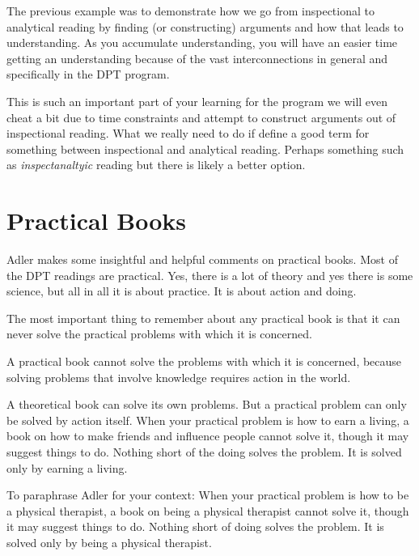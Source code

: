 The previous example was to demonstrate how we go from inspectional to analytical reading by finding (or constructing) arguments and how that leads to understanding. As you accumulate understanding, you will have an easier time getting an understanding because of the vast interconnections in general and specifically in the DPT program. 

This is such an important part of your learning for the program we will even cheat a bit due to time constraints and attempt to construct arguments out of inspectional reading. What we really need to do if define a good term for something between inspectional and analytical reading. Perhaps something such as \textit{inspectanaltyic} reading but there is likely a better option.


\section{Practical Books}

Adler makes some insightful and helpful comments on practical books. Most of the DPT readings are practical. Yes, there is a lot of theory and yes there is some science, but all in all it is about practice. It is about action and doing. 

\begin{displayquote}
The most important thing to remember about any practical book is that it can never solve the practical problems with which it is concerned.
\end{displayquote}

A practical book cannot solve the problems with which it is concerned, because solving problems that involve knowledge requires action in the world. 

\begin{displayquote}
A theoretical book can solve its own problems. But a practical problem can only be solved by action itself. When your practical problem is how to earn a living, a book on how to make friends and influence people cannot solve it, though it may suggest things to do. Nothing short of the doing solves the problem. It is solved only by earning a living.
\end{displayquote}

To paraphrase Adler for your context: When your practical problem is how to be a physical therapist, a book on being a physical therapist cannot solve it, though it may suggest things to do. Nothing short of doing solves the problem. It is solved only by being a physical therapist.

